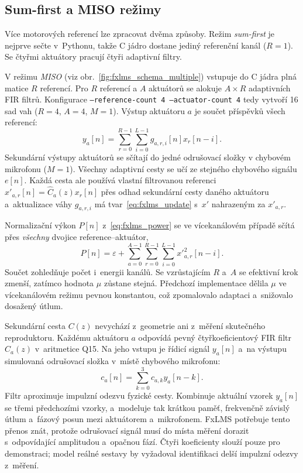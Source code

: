 \documentclass[conference]{IEEEtran}
\newcommand{\code}[1]{\texttt{#1}}
\begin{document}
\subsection{Sum-first a MISO režimy}
Více motorových referencí lze zpracovat dvěma způsoby. Režim \emph{sum-first} je nejprve sečte v~Pythonu, takže C jádro dostane jediný referenční kanál ($R=1$). Se čtyřmi aktuátory pracují čtyři adaptivní filtry.

V režimu \emph{MISO} (viz obr.~\ref{fig:fxlms_schema_multiple}) vstupuje do C jádra plná matice $R$ referencí. Pro $R$ referencí a $A$ aktuátorů se alokuje $A \times R$ adaptivních FIR filtrů. Konfigurace \code{--reference-count 4 --actuator-count 4} tedy vytvoří 16 sad vah ($R=4$, $A=4$, $M=1$). Výstup aktuátoru $a$ je součet příspěvků všech referencí:
\begin{equation}
  y_a[n] = \sum_{r=0}^{R-1}\sum_{i=0}^{L-1} g_{a,r,i}[n]x_r[n-i].
\end{equation}
Sekundární výstupy aktuátorů se sčítají do jedné odrušovací složky v chybovém mikrofonu ($M=1$). Všechny adaptivní cesty se učí ze stejného chybového signálu $e[n]$. Každá cesta ale používá vlastní filtrovanou referenci $x'_{a,r}[n]=\hat{C}_a(z)x_r[n]$ přes odhad sekundární cesty daného aktuátoru a~aktualizace váhy $g_{a,r,i}$ má tvar~\eqref{eq:fxlms_update} s~$x'$ nahrazeným za $x'_{a,r}$.

Normalizační výkon $P[n]$ z~\eqref{eq:fxlms_power} se ve vícekanálovém případě sčítá přes \emph{všechny} dvojice reference--aktuátor,
\begin{equation}
  P[n] = \varepsilon + \sum_{a=0}^{A-1}\sum_{r=0}^{R-1}\sum_{i=0}^{L-1} {x'}_{a,r}^2[n-i].
  \label{eq:fxlms_power_multi}
\end{equation}
Součet zohledňuje počet i~energii kanálů. Se vzrůstajícím $R$ a~$A$ se efektivní krok zmenší, zatímco hodnota $\mu$ zůstane stejná. Předchozí implementace dělila $\mu$ ve vícekanálovém režimu pevnou konstantou, což zpomalovalo adaptaci a~snižovalo dosažený útlum.

Sekundární cesta $C(z)$ nevychází z~geometrie ani z~měření skutečného reproduktoru. Každému aktuátoru $a$ odpovídá pevný čtyřkoeficientový FIR filtr $C_a(z)$ v~aritmetice Q15. Na jeho vstupu je řídicí signál $y_a[n]$ a~na výstupu simulovaná odrušovací složka v~místě chybového mikrofonu:
\begin{equation}
  c_a[n] = \sum_{k=0}^{3} c_{a,k}y_a[n-k].
\end{equation}
Filtr aproximuje impulzní odezvu fyzické cesty. Kombinuje aktuální vzorek $y_a[n]$ se třemi předchozími vzorky, a~modeluje tak krátkou paměť, frekvenčně závislý útlum a~fázový posun mezi aktuátorem a~mikrofonem. FxLMS potřebuje tento přenos znát, protože odrušovací signál musí do místa měření dorazit s~odpovídající amplitudou a~opačnou fází. Čtyři koeficienty slouží pouze pro demonstraci; model reálné sestavy by vyžadoval identifikaci delší impulzní odezvy z~měření.
\end{document}
